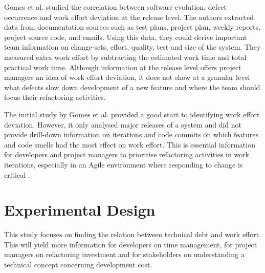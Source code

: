 Gomes et al. \cite{Gomes2011} studied the correlation between software
evolution, defect occurrence and work effort deviation at the release level. The
authors extracted data from documentation sources such as test plans, project
plan, weekly reports, project source code, and emails. Using this data, they
could derive important team information on change-sets, effort, quality, test
and size of the system. They measured extra work effort by subtracting the
estimated work time and total practical work time. Although information at the
release level offers project managers an idea of work effort deviation, it does
not show at a granular level what defects slow down development of a new feature
and where the team should focus their refactoring activities.

The initial study by Gomes et al. \cite{Gomes2011} provided a good start to
identifying work effort deviation. However, it only analysed major releases of a
system and did not provide drill-down information on iterations and code commits
on which features and code smells had the most effect on work effort. This is
essential information for developers and project managers to prioritise
refactoring activities in work iterations, especially in an Agile environment
where responding to change is critical \cite{agile-manifesto}.

\section{Experimental Design}
\label{work-plan}

This study focuses on finding the relation between technical debt and work
effort. This will yield more information for developers on time management, for
project managers on refactoring investment and for stakeholders on understanding
a technical concept concerning development cost.

